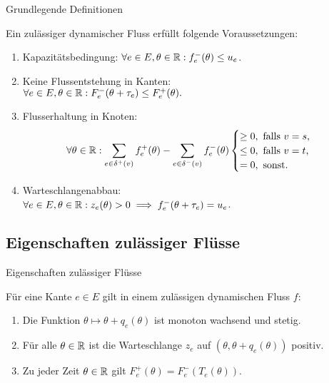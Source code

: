 \begin{frame}{Grundlegende Definitionen}
	\begin{definition}
		Ein zulässiger dynamischer Fluss erfüllt folgende Voraussetzungen:
		\begin{enumerate}[leftmargin=2.5em, label=(F\arabic*)]
			\pause\item\label{def-feasible-flow-capacity} Kapazitätsbedingung: $\forall e\in E, \theta\in\mathbb{R}: f_e^-(\theta)\leq u_e$.
			\pause\item\label{def-feasible-flow-no-negative-flow} Keine Flussentstehung in Kanten:\\ $\forall e\in E, \theta\in\mathbb{R}: F_e^-(\theta + \tau_e) \leq F_e^+(\theta).$
			\pause\item\label{def-feasible-flow-no-flow-at-node} Flusserhaltung in Knoten:
			\setlength{\belowdisplayskip}{0em}			\setlength{\abovedisplayskip}{0em}
			\begin{align*}
				\forall\theta\in\mathbb{R}: \sum_{e\in\delta^+(v)}f^+_e(\theta) - \sum_{e\in\delta^-(v)} f_e^-(\theta) \begin{cases}
					\geq 0, \text{ falls $v=s$,}\\
					\leq 0, \text{ falls $v=t$,}\\
					= 0, \text{ sonst.}
				\end{cases}
			\end{align*}
			
			\pause\item\label{def-feasible-flow-queue-with-capacity} Warteschlangenabbau:\\
			$\forall e\in E, \theta\in\mathbb{R}: z_e(\theta) > 0 \implies f_e^-(\theta + \tau_e) = u_e$.
		\end{enumerate}
	\end{definition}
\end{frame}

\subsection{Eigenschaften zulässiger Flüsse}
\begin{frame}{Eigenschaften zulässiger Flüsse}
	\begin{proposition}\label{prop-feasible-flow}
		Für eine Kante $e\in E$ gilt in einem zulässigen dynamischen Fluss $f$:
		\begin{enumerate}[label=(\roman*)]
			\item\label{prop-feasible-flow-T-mon-inc-cont} Die Funktion $\theta \mapsto \theta + q_e(\theta)$ ist monoton wachsend und stetig.
			\item\label{prop-feasible-flow-positive-queue} Für alle $\theta\in\mathbb{R}$ ist die Warteschlange $z_e$ auf $(\theta, \theta + q_e(\theta))$ positiv.
			\item\label{prop-feasible-flow-det-outflow} Zu jeder Zeit $\theta\in\mathbb{R}$ gilt $F_e^+(\theta) = F_e^-(T_e(\theta))$.
		\end{enumerate}
	\end{proposition}
\end{frame}

